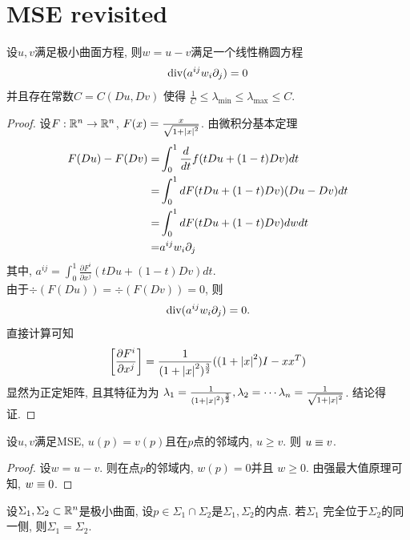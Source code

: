 \section{MSE revisited}
\begin{proposition}
    设$u,v$满足极小曲面方程, 则$w=u-v$满足一个线性椭圆方程
    \begin{equation}
        {\text{div}}(a^{ij}w_i{\partial_j}) =0
    \end{equation}
    并且存在常数$C=C(Du,Dv)$ 使得 $\frac{1}{C} \le \lambda_{\min} \le \lambda_{\max} \le C$.
\end{proposition}
\begin{proof}
    设$F: \mathbb{R}^n \to \mathbb{R}^n$, $F(x)=\frac{x}{\sqrt{1+\left | x \right |^2}}$. 由微积分基本定理
    \begin{equation}
        \begin{split}
            F(Du)-F(Dv)= & \int^1_0 \frac{d}{dt} f(tDu+(1-t)Dv)dt \\
            =& \int^1_0 dF(tDu+(1-t)Dv)(Du-Dv)dt\\
            =& \int^1_0 dF(tDu+(1-t)Dv)dwdt\\
            =& a^{ij}w_i{\partial_j}
        \end{split} 
    \end{equation}
    其中, $a^{ij}=\int^1_0 \frac{\partial F^i}{\partial x^j}(tDu+(1-t)Dv)dt$. \\
    由于$\div(F(Du)) = \div(F(Dv))=0$, 则
    \begin{equation}
        {\text{div}}(a^{ij}w_i{\partial_j})=0.
    \end{equation}
    直接计算可知
    \begin{equation}
        \left[\frac{\partial F^i}{\partial x^j}\right] = \frac{1}{(1+\left | x \right |^2)^\frac{3}{2}}((1+\left | x \right |^2)I-xx^T)
    \end{equation}
    显然为正定矩阵, 且其特征为为 $\lambda_1=\frac{1}{(1+\left | x \right |^2)^{\frac{3}{2}}}, \lambda_2=\cdots\lambda_n=\frac{1}{\sqrt{1+\left | x \right |^2}}$. 结论得证.
\end{proof}
\begin{corollary}
    设$u,v$满足MSE, $u(p)=v(p)$且在$p$点的邻域内, $u \ge v$. 则 $u\equiv v$.
\end{corollary}
\begin{proof}
    设$w=u-v$. 则在点$p$的邻域内, $w(p)=0$并且 $w \ge 0$. 由强最大值原理可知, $w\equiv 0$.
\end{proof}
\begin{corollary}
    设$\Sigma_1,\Sigma_2 \subset \mathbb{R}^n$是极小曲面, 设$p \in \Sigma_1 \cap \Sigma_2$是$\Sigma_1,\Sigma_2$的内点. 若$\Sigma_1$ 完全位于$\Sigma_2$的同一侧, 则$\Sigma_1=\Sigma_2$.
\end{corollary}
